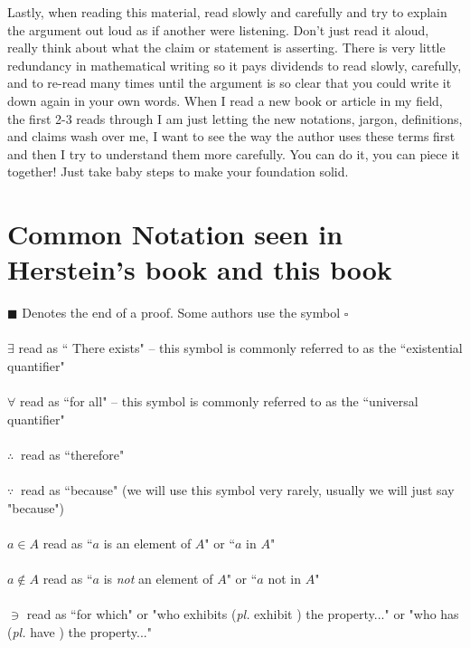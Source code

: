 Lastly, when reading this material, read slowly and carefully and try to explain the argument out loud as if another were listening. Don't just read it aloud, really think about what the claim or statement is asserting. There is very little redundancy in mathematical writing so it pays dividends to read slowly, carefully, and to re-read many times until the argument is so clear that you could write it down again in your own words. When I read a new book or article in my field, the first 2-3 reads through I am just letting the new notations, jargon, definitions, and claims wash over me, I want to see the way the author uses these terms first and then I try to understand them more carefully. You can do it, you can piece it together! Just take baby steps to make your foundation solid. \newpage
\section{Common Notation seen in Herstein's book and this book}
$\blacksquare$ Denotes the end of a proof. Some authors  use the symbol \index{$\blacksquare$} $\square$\\ \\
$\exists$ read as `` There exists" \index{$\exists$} -- this symbol is commonly referred to as the ``existential quantifier"\\ \\
$\forall$ read as ``for all" \index{$\forall$} -- this symbol is commonly referred to as the ``universal quantifier"\\ \\
$\therefore \ $  read as ``therefore" \index{$\therefore$}\\ \\
$\because \ $ read as ``because" (we will use this symbol very rarely, usually we will just say "because")\\ \\
$a\in A$ read as ``$a$ is an element of $A$" or ``$a$ in $A$" \index{$\in$} \\ \\
$a\not\in A$ read as ``$a$ is \textit{not} an element of $A$" or ``$a$ not in $A$" \\ \\ \index{$\not\in$}
$\ni$ read as ``for which" or "who exhibits (\textit{pl.} exhibit ) the property..." or "who has (\textit{pl.} have ) the property..." \index{$\ni$}\\ \\


